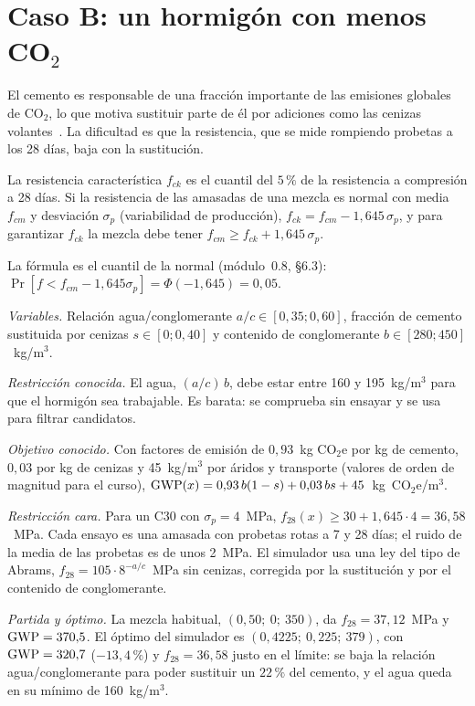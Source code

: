 \section{Caso B: un hormigón con menos CO\texorpdfstring{$_2$}{2}}

El cemento es responsable de una fracción importante de las emisiones globales de CO$_2$, lo que motiva sustituir parte de él por adiciones como las cenizas volantes~\cite{ament}. La dificultad es que la resistencia, que se mide rompiendo probetas a los 28 días, baja con la sustitución.

\begin{definicion}\label{def:fck}
La resistencia característica $f_{ck}$ es el cuantil del $5\,\%$ de la resistencia a compresión a 28 días. Si la resistencia de las amasadas de una mezcla es normal con media $f_{cm}$ y desviación $\sigma_p$ (variabilidad de producción), $f_{ck}=f_{cm}-1{,}645\,\sigma_p$, y para garantizar $f_{ck}$ la mezcla debe tener $f_{cm}\ge f_{ck}+1{,}645\,\sigma_p$.
\end{definicion}

La fórmula es el cuantil de la normal (módulo~0.8, §6.3): $\Pr[f<f_{cm}-1{,}645\sigma_p]=\Phi(-1{,}645)=0{,}05$.

\begin{ejemplo}\label{ej:hormigon}
\emph{Variables.} Relación agua/conglomerante $a/c\in[0{,}35;0{,}60]$, fracción de cemento sustituida por cenizas $s\in[0;0{,}40]$ y contenido de conglomerante $b\in[280;450]$~kg/m$^3$.

\emph{Restricción conocida.} El agua, $(a/c)\,b$, debe estar entre 160 y 195~kg/m$^3$ para que el hormigón sea trabajable. Es barata: se comprueba sin ensayar y se usa para filtrar candidatos.

\emph{Objetivo conocido.} Con factores de emisión de $0{,}93$~kg CO$_2$e por kg de cemento, $0{,}03$ por kg de cenizas y 45~kg/m$^3$ por áridos y transporte (valores de orden de magnitud para el curso), $\mathrm{GWP}(x)=0{,}93\,b(1-s)+0{,}03\,bs+45$~kg~CO$_2$e/m$^3$.

\emph{Restricción cara.} Para un C30 con $\sigma_p=4$~MPa, $f_{28}(x)\ge 30+1{,}645\cdot4=36{,}58$~MPa. Cada ensayo es una amasada con probetas rotas a 7 y 28 días; el ruido de la media de las probetas es de unos 2~MPa. El simulador usa una ley del tipo de Abrams, $f_{28}=105\cdot 8^{-a/c}$~MPa sin cenizas, corregida por la sustitución y por el contenido de conglomerante.

\emph{Partida y óptimo.} La mezcla habitual, $(0{,}50;\ 0;\ 350)$, da $f_{28}=37{,}12$~MPa y $\mathrm{GWP}=370{,}5$. El óptimo del simulador es $(0{,}4225;\ 0{,}225;\ 379)$, con $\mathrm{GWP}=320{,}7$ ($-13{,}4\,\%$) y $f_{28}=36{,}58$ justo en el límite: se baja la relación agua/conglomerante para poder sustituir un $22\,\%$ del cemento, y el agua queda en su mínimo de 160~kg/m$^3$.
\end{ejemplo}

